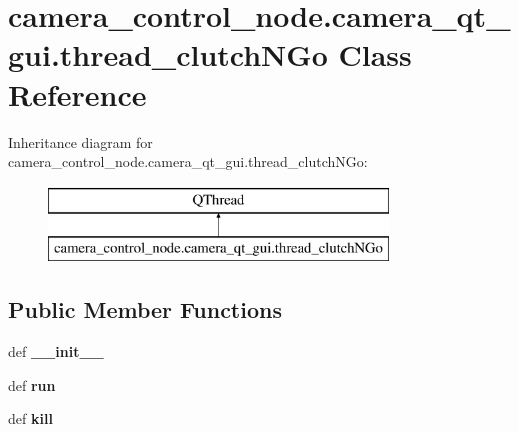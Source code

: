 \hypertarget{classcamera__control__node_1_1camera__qt__gui_1_1thread__clutchNGo}{\section{camera\-\_\-control\-\_\-node.\-camera\-\_\-qt\-\_\-gui.\-thread\-\_\-clutch\-N\-Go Class Reference}
\label{classcamera__control__node_1_1camera__qt__gui_1_1thread__clutchNGo}
}
Inheritance diagram for camera\-\_\-control\-\_\-node.\-camera\-\_\-qt\-\_\-gui.\-thread\-\_\-clutch\-N\-Go\-:\begin{figure}[H]
\begin{center}
\leavevmode
\includegraphics[height=2.000000cm]{classcamera__control__node_1_1camera__qt__gui_1_1thread__clutchNGo}
\end{center}
\end{figure}
\subsection*{Public Member Functions}
\begin{DoxyCompactItemize}
\item 
\hypertarget{classcamera__control__node_1_1camera__qt__gui_1_1thread__clutchNGo_a1a03b0b0d011607d46a2e6576b7f9eca}{def {\bfseries \-\_\-\-\_\-init\-\_\-\-\_\-}}\label{classcamera__control__node_1_1camera__qt__gui_1_1thread__clutchNGo_a1a03b0b0d011607d46a2e6576b7f9eca}

\item 
\hypertarget{classcamera__control__node_1_1camera__qt__gui_1_1thread__clutchNGo_a9de406eefce2f1861abcc956623284bf}{def {\bfseries run}}\label{classcamera__control__node_1_1camera__qt__gui_1_1thread__clutchNGo_a9de406eefce2f1861abcc956623284bf}

\item 
\hypertarget{classcamera__control__node_1_1camera__qt__gui_1_1thread__clutchNGo_a8faf1b8308702796f02ba59ab14373c2}{def {\bfseries kill}}\label{classcamera__control__node_1_1camera__qt__gui_1_1thread__clutchNGo_a8faf1b8308702796f02ba59ab14373c2}

\end{DoxyCompactItemize}
